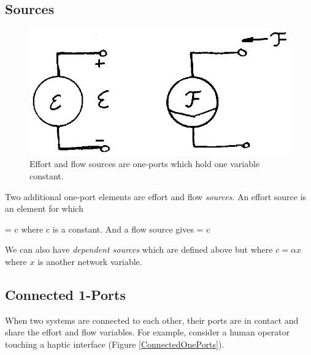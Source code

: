 
\subsection{Sources}

\begin{figure}[p]	%
\centering \includegraphics{figs14/00300.eps}
\caption{Effort and flow sources are one-ports which hold one variable constant.}\label{EffortFlowSources}	%
\end{figure}	%

Two additional one-port elements are effort and flow {\it sources}.    An effort source is an element for which

\bq
\ef = c
\eq
where c is a constant.   And a flow source gives
\bq
\fl = c
\eq

We can also have {\it dependent sources} which are defined above but  where $c = \alpha x$ where $x$ is another network variable.



\subsection{Connected 1-Ports}
When two systems are connected to each other, their ports are in contact and share the effort and flow variables.  For example, consider a human operator touching a haptic interface (Figure \ref{ConnectedOnePorts}).	%

